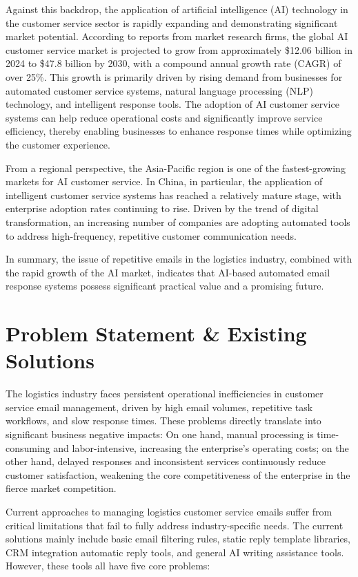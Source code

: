\documentclass[12pt]{article}
\begin{document}
Against this backdrop, the application of artificial intelligence (AI) technology in the customer service sector is rapidly expanding and demonstrating significant market potential. According to reports from market research firms, the global AI customer service market is projected to grow from approximately \$12.06 billion in 2024 to \$47.8 billion by 2030, with a compound annual growth rate (CAGR) of over 25\%. This growth is primarily driven by rising demand from businesses for automated customer service systems, natural language processing (NLP) technology, and intelligent response tools. The adoption of AI customer service systems can help reduce operational costs and significantly improve service efficiency, thereby enabling businesses to enhance response times while optimizing the customer experience.

From a regional perspective, the Asia-Pacific region is one of the fastest-growing markets for AI customer service. In China, in particular, the application of intelligent customer service systems has reached a relatively mature stage, with enterprise adoption rates continuing to rise. Driven by the trend of digital transformation, an increasing number of companies are adopting automated tools to address high-frequency, repetitive customer communication needs.

In summary, the issue of repetitive emails in the logistics industry, combined with the rapid growth of the AI market, indicates that AI-based automated email response systems possess significant practical value and a promising future.

\section{Problem Statement \& Existing Solutions}

The logistics industry faces persistent operational inefficiencies in customer service email management, driven by high email volumes, repetitive task workflows, and slow response times. These problems directly translate into significant business negative impacts: On one hand, manual processing is time-consuming and labor-intensive, increasing the enterprise's operating costs; on the other hand, delayed responses and inconsistent services continuously reduce customer satisfaction, weakening the core competitiveness of the enterprise in the fierce market competition.

Current approaches to managing logistics customer service emails suffer from critical limitations that fail to fully address industry-specific needs. The current solutions mainly include basic email filtering rules, static reply template libraries, CRM integration automatic reply tools, and general AI writing assistance tools. However, these tools all have five core problems:
\end{document}
